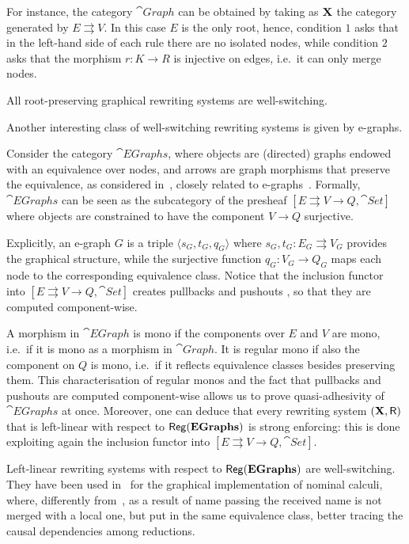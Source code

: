 For instance, the category $\cat{Graph}$ can be obtained
by taking as $\textbf {\textup{X}}$ the category generated by $E \rightrightarrows V$. In this case $E$ is the only root, hence, condition $1$ asks that in the left-hand side of each rule
there are no isolated nodes, while condition $2$ asks that the
morphism $r: K \to R$ is injective on edges, i.e.~it can only merge nodes.

\begin{lemma}%
	\label{bono}
	All root-preserving graphical rewriting systems are well-switching.
\end{lemma}

Another interesting class of well-switching rewriting systems is given by e-graphs.

\begin{example}[E-graphs]
	Consider the category $\cat{EGraphs}$, where objects are (directed)
	graphs endowed with an equivalence over nodes, and arrows are graph
	morphisms that preserve the equivalence, as considered
	in~\cite{BaldanGM06}, closely related to e-graphs~\cite{WNW:egg}. 
	Formally, $\cat{EGraphs}$ can be seen as the
	subcategory of the presheaf
	$[E \rightrightarrows V \to Q, \cat{Set}]$ where objects are
	constrained to have the component $V \to Q$ surjective. 
	
	Explicitly, an
	e-graph $G$ is a triple $\langle s_G, t_G, q_G \rangle$ where
	$s_G, t_G: E_G \rightrightarrows V_G$ provides the graphical
	structure, while the surjective function $q_G : V_G \to Q_G$ maps
	each node to the corresponding equivalence class. 
	Notice that the inclusion functor into  $[E \rightrightarrows V \to Q, \cat{Set}]$ 
	creates pullbacks and pushouts \cite{mac2013categories}, so that they are computed component-wise.
	
	A morphism in $\cat{EGraph}$ is mono if the components over $E$
	and $V$ are mono, i.e.~if it is mono as a morphism in
	$\cat{Graph}$. It is regular mono if also the component on
	$Q$ is mono, i.e.~if it reflects equivalence classes besides
	preserving them. This characterisation of regular monos and the fact that pullbacks and pushouts are computed component-wise allows us to prove quasi-adhesivity of $\cat{EGraphs}$ at once. Moreover, one can deduce that every rewriting system $(\textbf {\textup{X}}, \mathsf{R})$ that is left-linear with respect to $\mathsf{Reg}(\mathbf{EGraphs})$ is strong enforcing: this is done exploiting again the inclusion functor into $[E \rightrightarrows V \to Q, \cat{Set}]$.
	
	Left-linear rewriting systems with respect to $\mathsf{Reg}(\mathbf{EGraphs})$ are well-switching. They have been used in~\cite{BaldanGM06} for the graphical implementation of nominal calculi, where,
	differently from~\cite{Gad07}, as a result of name passing the received name is not merged with a local one, but put in the same equivalence class, better tracing the causal dependencies among reductions.
\end{example}


